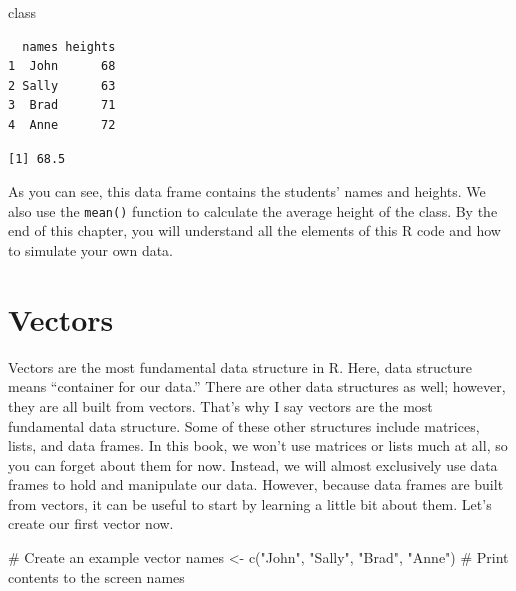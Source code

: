 \documentclass[
  letterpaper,
  DIV=11,
  numbers=noendperiod]{scrreprt}
\newenvironment{Shaded}{\begin{snugshade}}{\end{snugshade}}
\newcommand{\CommentTok}[1]{\textcolor[rgb]{0.37,0.37,0.37}{#1}}
\newcommand{\FunctionTok}[1]{\textcolor[rgb]{0.28,0.35,0.67}{#1}}
\newcommand{\NormalTok}[1]{\textcolor[rgb]{0.00,0.23,0.31}{#1}}
\newcommand{\OtherTok}[1]{\textcolor[rgb]{0.00,0.23,0.31}{#1}}
\newcommand{\SpecialCharTok}[1]{\textcolor[rgb]{0.37,0.37,0.37}{#1}}
\newcommand{\StringTok}[1]{\textcolor[rgb]{0.13,0.47,0.30}{#1}}
\begin{document}
\begin{Shaded}
\begin{Highlighting}[]
\NormalTok{class}
\end{Highlighting}
\end{Shaded}

\begin{verbatim}
  names heights
1  John      68
2 Sally      63
3  Brad      71
4  Anne      72
\end{verbatim}

\begin{Shaded}
\end{Shaded}

\begin{verbatim}
[1] 68.5
\end{verbatim}

As you can see, this data frame contains the students' names and
heights. We also use the \texttt{mean()} function to calculate the
average height of the class. By the end of this chapter, you will
understand all the elements of this R code and how to simulate your own
data.

\section{Vectors}\label{vectors}

Vectors are the most fundamental data structure in R. Here, data
structure means ``container for our data.'' There are other data
structures as well; however, they are all built from vectors. That's why
I say vectors are the most fundamental data structure. Some of these
other structures include matrices, lists, and data frames. In this book,
we won't use matrices or lists much at all, so you can forget about them
for now. Instead, we will almost exclusively use data frames to hold and
manipulate our data. However, because data frames are built from
vectors, it can be useful to start by learning a little bit about them.
Let's create our first vector now.

\begin{Shaded}
\begin{Highlighting}[]
\CommentTok{\# Create an example vector}
\NormalTok{names }\OtherTok{\textless{}{-}} \FunctionTok{c}\NormalTok{(}\StringTok{"John"}\NormalTok{, }\StringTok{"Sally"}\NormalTok{, }\StringTok{"Brad"}\NormalTok{, }\StringTok{"Anne"}\NormalTok{)}
\CommentTok{\# Print contents to the screen}
\NormalTok{names}
\end{Highlighting}
\end{Shaded}
\end{document}
